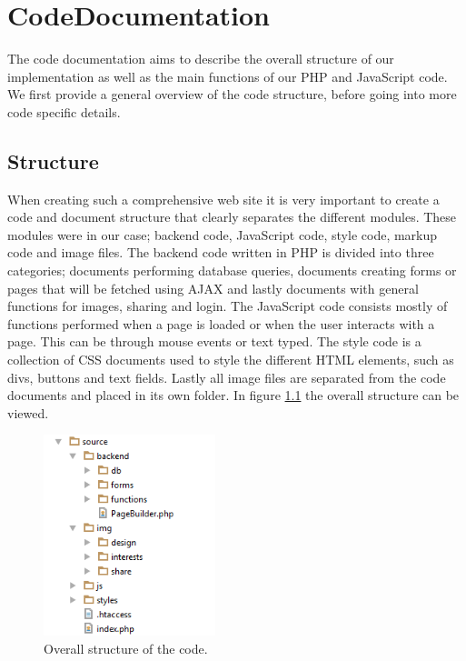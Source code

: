 \chapter{CodeDocumentation}
\label{apx:Code}

The code documentation aims to describe the overall structure of our implementation as well as the main functions of our PHP and JavaScript code. We first provide a general overview of the code structure, before going into more code specific details. 

\section{Structure}
\label{sec:CodeStructure}
When creating such a comprehensive web site it is very important to create a code and document structure that clearly separates the different modules. These modules were in our case; backend code, JavaScript code, style code, markup code and image files. The backend code written in PHP is divided into three categories; documents performing database queries, documents creating forms or pages that will be fetched using AJAX and lastly documents with general functions for images, sharing and login. The JavaScript code consists mostly of functions performed when a page is loaded or when the user interacts with a page. This can be through mouse events or text typed. The style code is a collection of CSS documents used to style the different HTML elements, such as divs, buttons and text fields. Lastly all image files are separated from the code documents and placed in its own folder. In figure \ref{fig:CodeStructureStruc} the overall structure can be viewed.

\begin{figure}[ht!]
  \centering
  \includegraphics[width=50mm]{./Appendix/CodeDocumentation/img/structure}
  \caption{Overall structure of the code.}
  \label{fig:CodeStructureStruc}
\end{figure}

